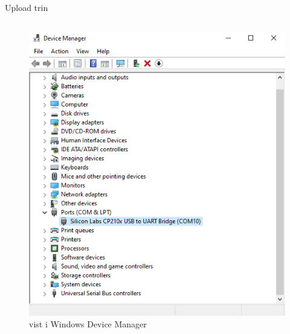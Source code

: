 \documentclass[aspectratio=169]{beamer}
\begin{document}
\begin{frame}{Upload trin}
\begin{columns}

	\begin{column}{0.5\textwidth}
		\begin{figure}
  			\includegraphics[height=0.6\textheight,keepaspectratio=true]{assets/pictures/devicemanager.png}
  			\caption{ vist i Windows Device Manager}
  			\label{fig:devicemanager}
		\end{figure}
	\end{column}


\end{columns}
\end{frame}
\end{document}
